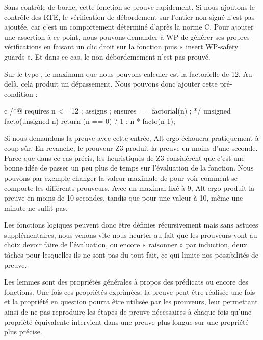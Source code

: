 \documentclass[middle]{zmdocument}
\begin{document}
Sans contrôle de borne, cette fonction se prouve rapidement. Si nous ajoutons
le contrôle des RTE, le vérification de débordement sur l'entier non-signé n'est
pas ajoutée, car c'est un comportement déterminé d'après la norme C. Pour ajouter
une assertion à ce point, nous pouvons demander à WP de générer ses propres 
vérifications en faisant un clic droit sur la fonction puis « insert WP-safety 
guards ». Et dans ce cas, le non-débordemement n'est pas prouvé.



Sur le type , le maximum que nous pouvons calculer est la factorielle de 
12. Au-delà, cela produit un dépassement. Nous pouvons donc ajouter cette 
pré-condition :



\begin{CodeBlock}{c}
/*@ 
  requires n <= 12 ;
  assigns \nothing ;
  ensures \result == factorial(n) ; 
*/
unsigned facto(unsigned n){
  return (n == 0) ? 1 : n * facto(n-1);
}
\end{CodeBlock}



Si nous demandons la preuve avec cette entrée, Alt-ergo échouera pratiquement à 
coup sûr. En revanche, le prouveur Z3 produit la preuve en moins d'une seconde.
Parce que dans ce cas précis, les heuristiques de Z3 considèrent que c'est une
bonne idée de passer un peu plus de temps sur l'évaluation de la fonction. Nous
pouvons par exemple changer la valeur maximale de  pour voir comment se 
comporte les différents prouveurs. Avec un  maximal fixé à 9, Alt-ergo produit
la preuve en moins de 10 secondes, tandis que pour une valeur à 10, même une 
minute ne suffit pas.



Les fonctions logiques peuvent donc être définies récursivement mais sans astuces
supplémentaires, nous venons vite nous heurter au fait que les prouveurs vont au 
choix devoir faire de l'évaluation, ou encore « raisonner » par induction, deux 
tâches pour lesquelles ils ne sont pas du tout fait, ce qui limite nos 
possibilités de preuve.





Les lemmes sont des propriétés générales à propos des prédicats ou encore des 
fonctions. Une fois ces propriétés exprimées, la preuve peut être réalisée une 
fois et la propriété en question pourra être utilisée par les prouveurs, leur 
permettant ainsi de ne pas reproduire les étapes de preuve nécessaires à chaque
fois qu'une propriété équivalente intervient dans une preuve plus longue sur 
une propriété plus précise.
\end{document}
